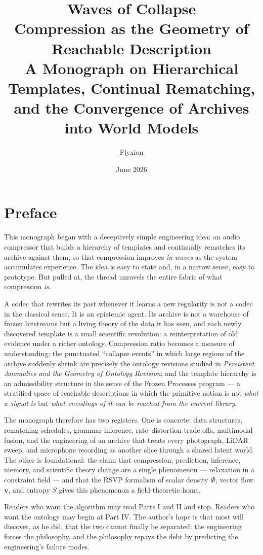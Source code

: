 \documentclass[11pt,oneside]{book}
\title{\Huge\textbf{Waves of Collapse}\\[1em]
\LARGE Compression as the Geometry of Reachable Description\\[2em]
\large A Monograph on Hierarchical Templates, Continual Rematching,\\
and the Convergence of Archives into World Models}
\author{Flyxion}
\date{June 2026}
\theoremstyle{remark}
\newcommand{\Phiv}{\Phi}
\newcommand{\vv}{\mathbf{v}}
\newcommand{\Sv}{S}
\begin{document}
\frontmatter
\maketitle

\chapter*{Preface}

This monograph began with a deceptively simple engineering idea: an audio
compressor that builds a hierarchy of templates and continually rematches
its archive against them, so that compression improves \emph{in waves} as
the system accumulates experience. The idea is easy to state and, in a
narrow sense, easy to prototype. But pulled at, the thread unravels the
entire fabric of what compression \emph{is}.

A codec that rewrites its past whenever it learns a new regularity is not
a codec in the classical sense. It is an epistemic agent. Its archive is
not a warehouse of frozen bitstreams but a living theory of the data it
has seen, and each newly discovered template is a small scientific
revolution: a reinterpretation of old evidence under a richer ontology.
Compression ratio becomes a measure of understanding; the punctuated
``collapse events'' in which large regions of the archive suddenly shrink
are precisely the ontology revisions studied in \emph{Persistent
Anomalies and the Geometry of Ontology Revision}; and the template
hierarchy is an admissibility structure in the sense of the
Frozen Processes program --- a stratified space of reachable descriptions
in which the primitive notion is not \emph{what a signal is} but
\emph{what encodings of it can be reached from the current library}.

The monograph therefore has two registers. One is concrete: data
structures, rematching schedules, grammar inference, rate--distortion
trade-offs, multimodal fusion, and the engineering of an archive that
treats every photograph, LiDAR sweep, and microphone recording as another
slice through a shared latent world. The other is foundational: the claim
that compression, prediction, inference, memory, and scientific theory
change are a single phenomenon --- relaxation in a constraint field ---
and that the RSVP formalism of scalar density $\Phiv$, vector flow
$\vv$, and entropy $\Sv$ gives this phenomenon a field-theoretic home.

Readers who want the algorithm may read Parts I and II and stop. Readers
who want the ontology may begin at Part IV. The author's hope is that
most will discover, as he did, that the two cannot finally be separated:
the engineering forces the philosophy, and the philosophy repays the debt
by predicting the engineering's failure modes.
\end{document}
